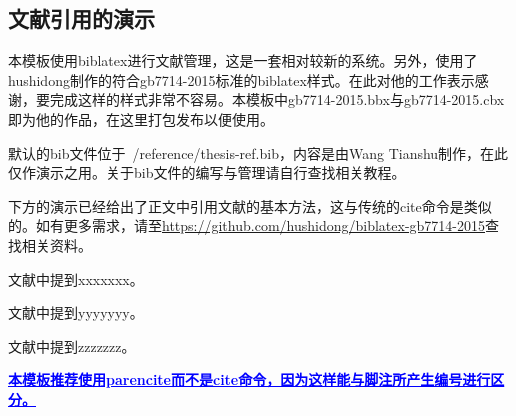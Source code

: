 \subsection{文献引用的演示}
\par 本模板使用biblatex进行文献管理，这是一套相对较新的系统。另外，使用了hushidong制作的符合gb7714-2015标准的biblatex样式。在此对他的工作表示感谢，要完成这样的样式非常不容易。本模板中gb7714-2015.bbx与gb7714-2015.cbx即为他的作品，在这里打包发布以便使用。
\par 默认的bib文件位于~/reference/thesis-ref.bib，内容是由Wang Tianshu制作，在此仅作演示之用。关于bib文件的编写与管理请自行查找相关教程。
\par 下方的演示已经给出了正文中引用文献的基本方法，这与传统的cite命令是类似的。如有更多需求，请至\url{https://github.com/hushidong/biblatex-gb7714-2015}查找相关资料。
\par 文献\parencite{Yang_Hy200215}中提到xxxxxxx。
\par 文献\parencite{Joa1999}中提到yyyyyyy。
\par 文献\parencite{Altman1997}中提到zzzzzzz。
\par \textcolor{blue}{\textbf{\uline{本模板推荐使用parencite而不是cite命令，因为这样能与脚注所产生编号进行区分。}}}

